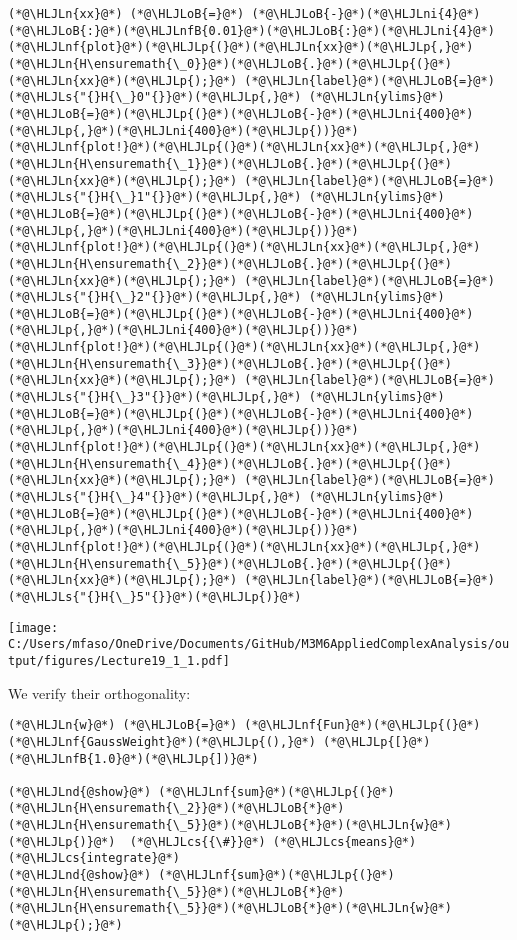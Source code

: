 \documentclass[12pt,a4paper]{article}
\newcommand{\HLJLn}[1]{#1}
\newcommand{\HLJLnd}[1]{\textcolor[RGB]{214,102,97}{#1}}
\newcommand{\HLJLnf}[1]{\textcolor[RGB]{66,102,213}{#1}}
\newcommand{\HLJLs}[1]{\textcolor[RGB]{201,61,57}{#1}}
\newcommand{\HLJLnfB}[1]{\textcolor[RGB]{59,151,46}{#1}}
\newcommand{\HLJLni}[1]{\textcolor[RGB]{59,151,46}{#1}}
\newcommand{\HLJLoB}[1]{\textcolor[RGB]{102,102,102}{\textbf{#1}}}
\newcommand{\HLJLp}[1]{#1}
\newcommand{\HLJLcs}[1]{\textcolor[RGB]{153,153,119}{\textit{#1}}}
\begin{document}
\begin{lstlisting}
(*@\HLJLn{xx}@*) (*@\HLJLoB{=}@*) (*@\HLJLoB{-}@*)(*@\HLJLni{4}@*)(*@\HLJLoB{:}@*)(*@\HLJLnfB{0.01}@*)(*@\HLJLoB{:}@*)(*@\HLJLni{4}@*)
(*@\HLJLnf{plot}@*)(*@\HLJLp{(}@*)(*@\HLJLn{xx}@*)(*@\HLJLp{,}@*) (*@\HLJLn{H\ensuremath{\_0}}@*)(*@\HLJLoB{.}@*)(*@\HLJLp{(}@*)(*@\HLJLn{xx}@*)(*@\HLJLp{);}@*) (*@\HLJLn{label}@*)(*@\HLJLoB{=}@*)(*@\HLJLs{"{}H{\_}0"{}}@*)(*@\HLJLp{,}@*) (*@\HLJLn{ylims}@*)(*@\HLJLoB{=}@*)(*@\HLJLp{(}@*)(*@\HLJLoB{-}@*)(*@\HLJLni{400}@*)(*@\HLJLp{,}@*)(*@\HLJLni{400}@*)(*@\HLJLp{))}@*)
(*@\HLJLnf{plot!}@*)(*@\HLJLp{(}@*)(*@\HLJLn{xx}@*)(*@\HLJLp{,}@*) (*@\HLJLn{H\ensuremath{\_1}}@*)(*@\HLJLoB{.}@*)(*@\HLJLp{(}@*)(*@\HLJLn{xx}@*)(*@\HLJLp{);}@*) (*@\HLJLn{label}@*)(*@\HLJLoB{=}@*)(*@\HLJLs{"{}H{\_}1"{}}@*)(*@\HLJLp{,}@*) (*@\HLJLn{ylims}@*)(*@\HLJLoB{=}@*)(*@\HLJLp{(}@*)(*@\HLJLoB{-}@*)(*@\HLJLni{400}@*)(*@\HLJLp{,}@*)(*@\HLJLni{400}@*)(*@\HLJLp{))}@*)
(*@\HLJLnf{plot!}@*)(*@\HLJLp{(}@*)(*@\HLJLn{xx}@*)(*@\HLJLp{,}@*) (*@\HLJLn{H\ensuremath{\_2}}@*)(*@\HLJLoB{.}@*)(*@\HLJLp{(}@*)(*@\HLJLn{xx}@*)(*@\HLJLp{);}@*) (*@\HLJLn{label}@*)(*@\HLJLoB{=}@*)(*@\HLJLs{"{}H{\_}2"{}}@*)(*@\HLJLp{,}@*) (*@\HLJLn{ylims}@*)(*@\HLJLoB{=}@*)(*@\HLJLp{(}@*)(*@\HLJLoB{-}@*)(*@\HLJLni{400}@*)(*@\HLJLp{,}@*)(*@\HLJLni{400}@*)(*@\HLJLp{))}@*)
(*@\HLJLnf{plot!}@*)(*@\HLJLp{(}@*)(*@\HLJLn{xx}@*)(*@\HLJLp{,}@*) (*@\HLJLn{H\ensuremath{\_3}}@*)(*@\HLJLoB{.}@*)(*@\HLJLp{(}@*)(*@\HLJLn{xx}@*)(*@\HLJLp{);}@*) (*@\HLJLn{label}@*)(*@\HLJLoB{=}@*)(*@\HLJLs{"{}H{\_}3"{}}@*)(*@\HLJLp{,}@*) (*@\HLJLn{ylims}@*)(*@\HLJLoB{=}@*)(*@\HLJLp{(}@*)(*@\HLJLoB{-}@*)(*@\HLJLni{400}@*)(*@\HLJLp{,}@*)(*@\HLJLni{400}@*)(*@\HLJLp{))}@*)
(*@\HLJLnf{plot!}@*)(*@\HLJLp{(}@*)(*@\HLJLn{xx}@*)(*@\HLJLp{,}@*) (*@\HLJLn{H\ensuremath{\_4}}@*)(*@\HLJLoB{.}@*)(*@\HLJLp{(}@*)(*@\HLJLn{xx}@*)(*@\HLJLp{);}@*) (*@\HLJLn{label}@*)(*@\HLJLoB{=}@*)(*@\HLJLs{"{}H{\_}4"{}}@*)(*@\HLJLp{,}@*) (*@\HLJLn{ylims}@*)(*@\HLJLoB{=}@*)(*@\HLJLp{(}@*)(*@\HLJLoB{-}@*)(*@\HLJLni{400}@*)(*@\HLJLp{,}@*)(*@\HLJLni{400}@*)(*@\HLJLp{))}@*)
(*@\HLJLnf{plot!}@*)(*@\HLJLp{(}@*)(*@\HLJLn{xx}@*)(*@\HLJLp{,}@*) (*@\HLJLn{H\ensuremath{\_5}}@*)(*@\HLJLoB{.}@*)(*@\HLJLp{(}@*)(*@\HLJLn{xx}@*)(*@\HLJLp{);}@*) (*@\HLJLn{label}@*)(*@\HLJLoB{=}@*)(*@\HLJLs{"{}H{\_}5"{}}@*)(*@\HLJLp{)}@*)
\end{lstlisting}

\texttt{[image: C:/Users/mfaso/OneDrive/Documents/GitHub/M3M6AppliedComplexAnalysis/output/figures/Lecture19\_1\_1.pdf]}

We verify their orthogonality:


\begin{lstlisting}
(*@\HLJLn{w}@*) (*@\HLJLoB{=}@*) (*@\HLJLnf{Fun}@*)(*@\HLJLp{(}@*)(*@\HLJLnf{GaussWeight}@*)(*@\HLJLp{(),}@*) (*@\HLJLp{[}@*)(*@\HLJLnfB{1.0}@*)(*@\HLJLp{])}@*)

(*@\HLJLnd{@show}@*) (*@\HLJLnf{sum}@*)(*@\HLJLp{(}@*)(*@\HLJLn{H\ensuremath{\_2}}@*)(*@\HLJLoB{*}@*)(*@\HLJLn{H\ensuremath{\_5}}@*)(*@\HLJLoB{*}@*)(*@\HLJLn{w}@*)(*@\HLJLp{)}@*)  (*@\HLJLcs{{\#}}@*) (*@\HLJLcs{means}@*) (*@\HLJLcs{integrate}@*)
(*@\HLJLnd{@show}@*) (*@\HLJLnf{sum}@*)(*@\HLJLp{(}@*)(*@\HLJLn{H\ensuremath{\_5}}@*)(*@\HLJLoB{*}@*)(*@\HLJLn{H\ensuremath{\_5}}@*)(*@\HLJLoB{*}@*)(*@\HLJLn{w}@*)(*@\HLJLp{);}@*)
\end{lstlisting}
\end{document}
